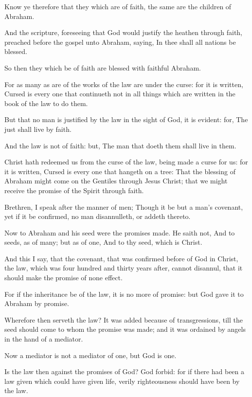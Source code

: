 \verse Know ye therefore that they which are of faith, the same are the children of Abraham.

\verse And the scripture, foreseeing that God would justify the heathen through faith, preached before the gospel unto Abraham, saying, In thee shall all nations be blessed.

\verse So then they which be of faith are blessed with faithful Abraham.

\verse For as many as are of the works of the law are under the curse: for it is written, Cursed is every one that continueth not in all things which are written in the book of the law to do them.

\verse But that no man is justified by the law in the sight of God, it is evident: for, The just shall live by faith.

\verse And the law is not of faith: but, The man that doeth them shall live in them.

\verse Christ hath redeemed us from the curse of the law, being made a curse for us: for it is written, Cursed is every one that hangeth on a tree: \verse That the blessing of Abraham might come on the Gentiles through Jesus Christ; that we might receive the promise of the Spirit through faith.

\verse Brethren, I speak after the manner of men; Though it be but a man's covenant, yet if it be confirmed, no man disannulleth, or addeth thereto.

\verse Now to Abraham and his seed were the promises made. He saith not, And to seeds, as of many; but as of one, And to thy seed, which is Christ.

\verse And this I say, that the covenant, that was confirmed before of God in Christ, the law, which was four hundred and thirty years after, cannot disannul, that it should make the promise of none effect.

\verse For if the inheritance be of the law, it is no more of promise: but God gave it to Abraham by promise.

\verse Wherefore then serveth the law? It was added because of transgressions, till the seed should come to whom the promise was made; and it was ordained by angels in the hand of a mediator.

\verse Now a mediator is not a mediator of one, but God is one.

\verse Is the law then against the promises of God? God forbid: for if there had been a law given which could have given life, verily righteousness should have been by the law.

